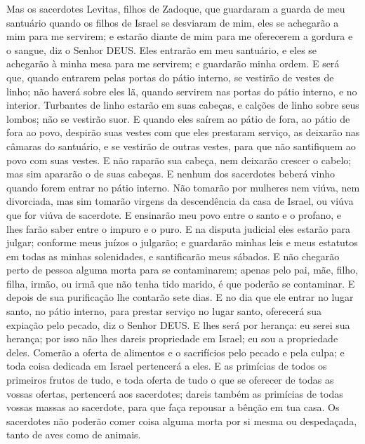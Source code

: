 {Mas os sacerdotes Levitas, filhos de Zadoque, que guardaram a guarda de meu santuário quando os filhos de Israel se desviaram de mim, eles se achegarão a mim para me servirem; e estarão diante de mim para me oferecerem a gordura e o sangue, diz o Senhor DEUS.
Eles entrarão em meu santuário, e eles se achegarão à minha mesa para me servirem; e guardarão minha ordem.
E será que, quando entrarem pelas portas do pátio interno, se vestirão de vestes de linho; não haverá sobre eles lã, quando servirem nas portas do pátio interno, e no interior.
Turbantes de linho estarão em suas cabeças, e calções de linho sobre seus lombos; não se vestirão
{} suor.
E quando eles saírem ao pátio de fora, ao pátio de fora ao povo, despirão suas vestes com que eles prestaram serviço, as deixarão nas câmaras do santuário, e se vestirão de outras vestes, para que não santifiquem ao povo com suas vestes.
E não raparão sua cabeça, nem deixarão crescer o cabelo; mas sim apararão o
{} de suas cabeças.
E nenhum dos sacerdotes beberá vinho quando forem entrar no pátio interno.
Não tomarão por mulheres nem viúva, nem divorciada, mas sim tomarão virgens da descendência
 da casa de Israel, ou viúva que for viúva de sacerdote.
E ensinarão meu povo
{} entre o santo e o profano, e lhes farão saber
{} entre o impuro e o puro.
E na disputa judicial eles estarão para julgar; conforme meus juízos o julgarão; e guardarão minhas leis e meus estatutos em todas as minhas solenidades, e santificarão meus sábados.
E não chegarão perto de pessoa alguma morta para se contaminarem; apenas pelo pai, mãe, filho, filha, irmão, ou irmã que não tenha tido marido, é que poderão se contaminar.
E depois de sua purificação lhe contarão sete dias.
E no dia que ele entrar no lugar santo, no pátio interno, para prestar serviço no lugar santo, oferecerá sua expiação pelo pecado, diz o Senhor DEUS.
E
{} lhes será por herança: eu serei sua herança; por isso não lhes dareis propriedade
{} em Israel; eu sou a propriedade deles.
Comerão a oferta de alimentos e o sacrifícios pelo pecado e pela culpa; e toda coisa dedicada em Israel pertencerá a eles.
E as primícias de todos os primeiros frutos de tudo, e toda oferta de tudo o que se oferecer de todas as vossas ofertas, pertencerá aos sacerdotes; dareis também as primícias de todas vossas massas ao sacerdote, para que faça repousar a bênção em tua casa.
Os sacerdotes não poderão comer coisa alguma morta por si mesma ou despedaçada, tanto de aves como de animais.

}
